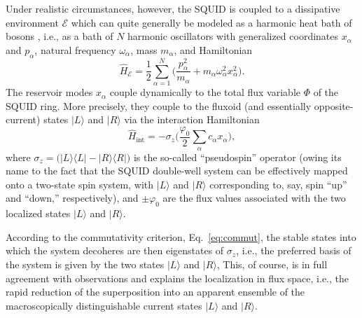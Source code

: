 \documentclass[twocolumn,aps,floatfix,amsmath,amssymb,showpacs,nofootinbib]{revtex4}
\newcommand{\be}{\begin{equation}} \newcommand{\ee}{\end{equation}}
\newcommand{\ket}[1]{\ensuremath{|{#1\rangle}}}
\newcommand{\ketbra}[2]{\ensuremath{|{#1 \rangle}{\langle #2}|}}
\begin{document}
Under realistic circumstances, however, the SQUID is coupled to a
dissipative environment $\mathcal{E}$ which can quite generally be
modeled as a harmonic heat bath of bosons \cite{Weiss:1999:tv}, i.e.,
as a bath of $N$ harmonic oscillators with generalized coordinates
$x_\alpha$ and $p_\alpha$, natural frequency $\omega_\alpha$, mass
$m_\alpha$, and Hamiltonian
%
\be
\widehat{H}_\mathcal{E} = \frac{1}{2} \sum_{\alpha=1}^N \biggl(
\frac{p^2_\alpha}{m_\alpha} + m_\alpha \omega^2_\alpha x^2_\alpha
\biggr).
\ee
%
The reservoir modes $x_\alpha$ couple dynamically to the total flux
variable $\Phi$ of the SQUID ring. More precisely, they couple to the
fluxoid (and essentially opposite-current) states $\ket{L}$ and
$\ket{R}$ via the interaction Hamiltonian \cite{Weiss:1999:tv}
%
\be
\widehat{H}_\text{int} = - \sigma_z
\biggl( \frac{\varphi_0}{2} \sum_\alpha c_\alpha x_\alpha 
\biggr), 
\ee
%
where $\sigma_z = \bigl( \ketbra{L}{L} - \ketbra{R}{R} \bigr)$ is the
so-called ``pseudospin'' operator (owing its name to the fact that the
SQUID double-well system can be effectively mapped onto a two-state
spin system, with $\ket{L}$ and $\ket{R}$ corresponding to, say, spin
``up'' and ``down,'' respectively), and $\pm \varphi_0$ are the flux
values associated with the two localized states $\ket{L}$ and $\ket{R}$.
 
According to the commutativity criterion, Eq.~\eqref{eq:commut}, the
stable states into which the system decoheres are then eigenstates of
$\sigma_z$, i.e., the preferred basis of the system is given by the
two states $\ket{L}$ and $\ket{R}$, This, of course, is in full
agreement with observations and explains the localization in flux
space, i.e., the rapid reduction of the superposition into an apparent
ensemble of the macroscopically distinguishable current states
$\ket{L}$ and $\ket{R}$.
\end{document}
